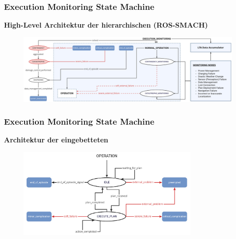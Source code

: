 \documentclass{beamer}
\begin{document}
\begin{frame}
  \frametitle{Execution Monitoring State Machine}
  \textbf{High-Level Architektur der hierarchischen  (ROS-SMACH)}
  \begin{figure}[H]
    \centering
    \includegraphics[width=\textwidth]{img/SMACH_high_level.png}
  \end{figure}
\end{frame}

\begin{frame}
  \frametitle{Execution Monitoring State Machine}
  \textbf{Architektur der eingebetteten }
  \begin{figure}[H]
    \centering
    \includegraphics[width=0.8\textwidth]{img/SMACH_low_level.png}
  \end{figure}
\end{frame}
\end{document}
